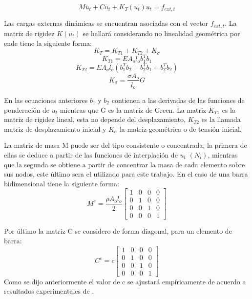 \begin{equation}\label{newton}
	M\ddot{u_t}+C\dot{u_t}+K_T(u_t)u_t=f_{ext,t}
\end{equation}

Las cargas externas dinámicas se encuentran asociadas con el vector $f_{ext,t}$. La matriz de rigidez $K(u_t)$ se hallará considerando no linealidad geométrica por ende tiene la siguiente forma:
\begin{equation}
	K_T=K_{T1}+K_{T2}+K_{\sigma} 
\end{equation}
\begin{equation}
	K_{T1}=EA_ol_ob_1^Tb_1
\end{equation}
\begin{equation}
	K_{T2}=EA_ol_o(b_1^Tb_2+b_2^Tb_1+b_2^Tb_2)
\end{equation}
\begin{equation}
	K_{\sigma}=\frac{\sigma A_o}{l_o}G
\end{equation}

En las ecuaciones anteriores $b_1$ y $b_2$ contienen a las derivadas de las funciones de ponderación de $u_t$  mientras que G es la matriz de Green. La matriz $K_{T1}$ es la matriz de rigidez lineal, esta no depende del desplazamiento, $K_{T2}$ es la llamada matriz de desplazamiento inicial y $K_{\sigma}$ la matriz geométrica o de tensión inicial.  

La matriz de masa M puede ser del tipo consistente o concentrada, la primera de ellas se deduce a partir de las funciones de interplación de $u_t$ $(N_i)$, mientras que la segunda se obtiene a partir de concentrar la masa de cada elemento sobre sus nodos, este último sera el utilizado para este trabajo. En el caso de una barra bidimensional tiene la siguiente forma: 
\begin{equation}
	M^e=\frac{\rho A_ol_o}{2}\begin{bmatrix}
		1&0  &0  &0 \\ 
		0& 1 &0  & 0\\ 
		0& 0 &1  &0 \\ 
		0& 0 & 0 & 1
	\end{bmatrix} 
\end{equation}


Por último la matriz C se considero de forma diagonal, para un elemento de barra:
\begin{equation}
	C^e=c \begin{bmatrix}
		1&0  &0  &0 \\ 
		0& 1 &0  & 0\\ 
		0& 0 &1  &0 \\ 
		0& 0 & 0 & 1
	\end{bmatrix} 
\end{equation}
Como se dijo anteriormente el valor de c se ajustará empíricamente de acuerdo a resultados experimentales de \cite{stengel2017measurements}.
